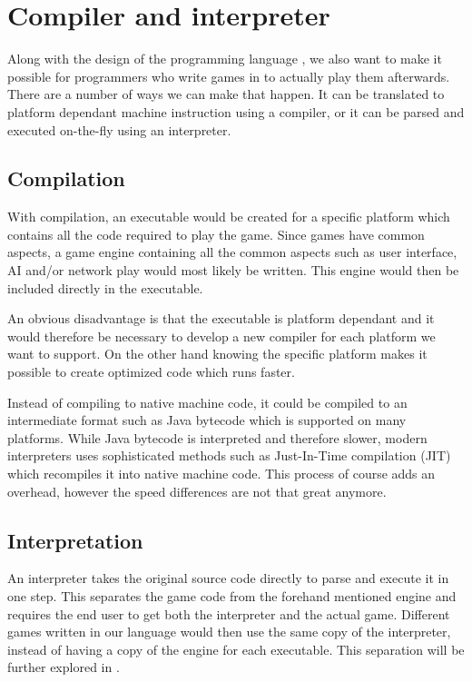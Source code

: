 \section{Compiler and interpreter}
Along with the design of the programming language \productname{}, we also want to make it possible for programmers who write games in \productname{} to actually play them afterwards. 
There are a number of ways we can make that happen. It can be translated to platform dependant machine instruction using a compiler, or it can be parsed and executed on-the-fly using an interpreter.

\subsection{Compilation}
With compilation, an executable would be created for a specific platform which contains all the code required to play the game. 
Since games have common aspects, a game engine containing all the common aspects such as user interface, AI and/or network play would most likely be written. 
This engine would then be included directly in the executable.

An obvious disadvantage is that the executable is platform dependant and it would therefore be necessary to develop a new compiler for each platform we want to support. 
On the other hand knowing the specific platform makes it possible to create optimized code which runs faster.

Instead of compiling to native machine code, it could be compiled to an intermediate format such as Java bytecode which is supported on many platforms.
While Java bytecode is interpreted and therefore slower, modern interpreters uses sophisticated methods such as Just-In-Time compilation (JIT) which recompiles it into native machine code. 
This process of course adds an overhead, however the speed differences are not that great anymore. 

\subsection{Interpretation}
An interpreter takes the original source code directly to parse and execute it in one step.
This separates the game code from the forehand mentioned engine and requires the end user to get both the interpreter and the actual game.
Different games written in our language would then use the same copy of the interpreter, instead of having a copy of the engine for each executable. This separation will be further explored in .

